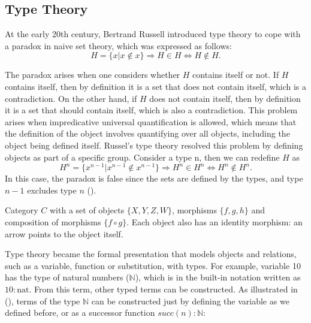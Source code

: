 \subsection{Type Theory}
At the early 20th century, Bertrand Russell introduced type theory to cope with a paradox in naive set theory, which was expressed as follows:
\begin{equation}
    H = \{ x | x \notin x\} \Rightarrow H \in H \Leftrightarrow H \notin H.
\end{equation}

The paradox arises when one considers whether $H$ contains itself or not. If $H$ contains itself, then by definition it is a set that does not contain itself, which is a contradiction. On the other hand, if $H$ does not contain itself, then by definition it is a set that should contain itself, which is also a contradiction. This problem arises when impredicative universal quantification is allowed, which means that the definition of the object involves quantifying over all objects, including the object being defined itself. Russel's type theory resolved this problem by defining objects as part of a specific group. Consider a type n, then we can redefine $H$ as
\begin{equation}
    H^n = \{ x^{n-1} | x^{n-1} \notin x^{n-1}\} \Rightarrow H^n \in H^n \Leftrightarrow H^n \notin H^n.
\end{equation}
In this case, the paradox is false since the sets are defined by the types, and type $n-1$ excludes type $n$ (\cite{eades_type_2012}).

\begin{marginfigure}
\centering

\vspace{0.5cm}
\caption{Category $C$ with a set of objects $\{X, Y, Z, W\}$, morphisms $\{f, g, h\}$ and composition of morphisms $\{f \circ g \}$. Each object also has an identity morphism: an arrow points to the object itself. }
\label{categoryGraph} 
\end{marginfigure}

Type theory became the formal presentation that models objects and relations, such as a variable, function or substitution, with types. For example, variable 10 has the type of natural numbers ($\mathbb{N}$), which is in the built-in notation written as $10: \textrm{nat}$. From this term, other typed terms can be constructed. As illustrated in (\cite{hoang_type_2014}), terms of the type $\mathbb{N}$ can be constructed just by defining the variable as we defined before, or as a successor function $succ(n) : \mathbb{N}$:

